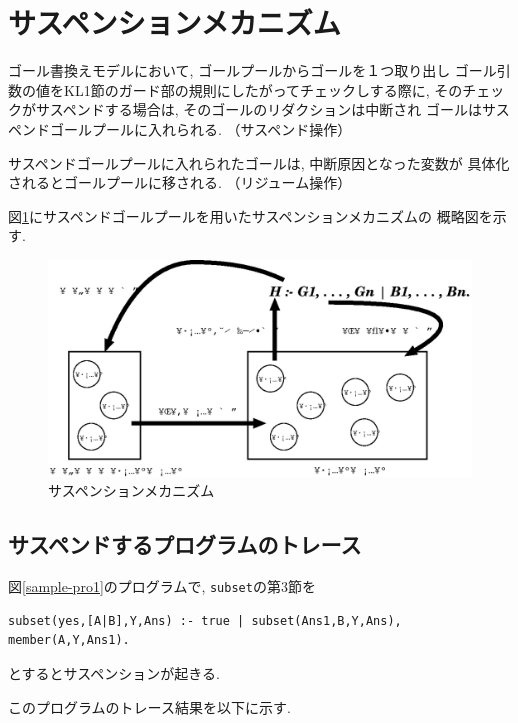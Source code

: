 \documentclass[a4,titlepage]{jsreport}
\begin{document}
\section{サスペンションメカニズム}

ゴール書換えモデルにおいて, ゴールプールからゴールを１つ取り出し
ゴール引数の値をKL1節のガード部の規則にしたがってチェックしする際に, 
そのチェックがサスペンドする場合は, そのゴールのリダクションは中断され
ゴールはサスペンドゴールプールに入れられる.  
（サスペンド操作）

サスペンドゴールプールに入れられたゴールは, 中断原因となった変数が
具体化されるとゴールプールに移される.  （リジューム操作）

図\ref{fig-suspend}にサスペンドゴールプールを用いたサスペンションメカニズムの
概略図を示す.  

\begin{figure}[htb]
\begin{center}
\includegraphics[width=.8\textwidth]{fig/suspention1.eps}
\caption{サスペンションメカニズム}
\label{fig-suspend}
\end{center}
\end{figure}

\subsection*{サスペンドするプログラムのトレース}

図\ref{sample-pro1}のプログラムで, {\tt subset}の第3節を
\begin{verbatim}
subset(yes,[A|B],Y,Ans) :- true | subset(Ans1,B,Y,Ans), member(A,Y,Ans1).
\end{verbatim}
とするとサスペンションが起きる.  

このプログラムのトレース結果を以下に示す.  
\end{document}
